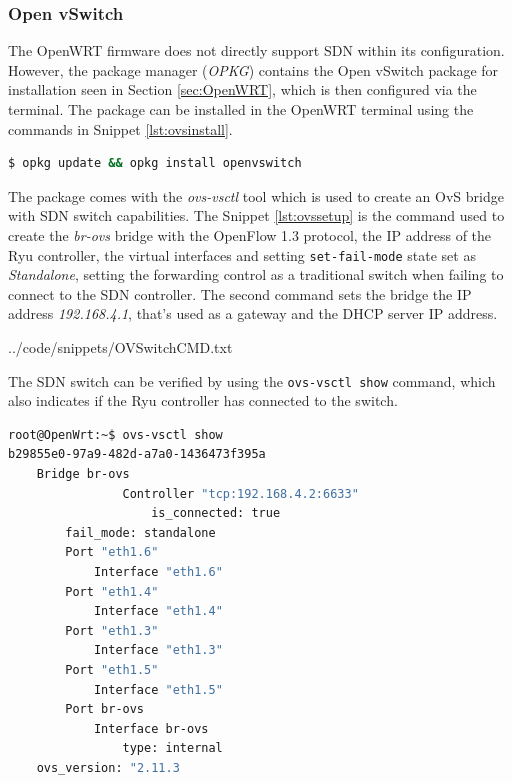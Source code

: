 \documentclass[12pt, oneside]{book}
\begin{document}
\subsubsection{Open vSwitch}
The OpenWRT firmware does not directly support SDN within its configuration. However, the package manager
(\emph{OPKG}) contains the Open vSwitch package for installation seen in Section \ref{sec:OpenWRT}, which
is then configured via the terminal. The package can be installed in the OpenWRT terminal using the
commands in Snippet \ref{lst:ovsinstall}.

\begin{lstlisting}[language=Bash,caption={OvS installation},captionpos=b,label={lst:ovsinstall}]
$ opkg update && opkg install openvswitch
\end{lstlisting}

The package comes with the \emph{ovs-vsctl} tool which is used to create an OvS bridge
with SDN switch capabilities. The Snippet \ref{lst:ovssetup} is the command used to create the \emph{br-ovs} bridge
with the OpenFlow 1.3 protocol, the IP address of the Ryu controller, the virtual interfaces and setting \lstinline{set-fail-mode}
state set as \emph{Standalone},
setting the forwarding control as a traditional switch when failing to connect to the SDN controller.
The second command sets the bridge the IP address \emph{192.168.4.1}, that's used as a gateway and the DHCP server IP address.


{../code/snippets/OVSwitchCMD.txt}

The SDN switch can be verified by using the \lstinline{ovs-vsctl show} command, which also indicates
if the Ryu controller has connected to the switch.
\begin{lstlisting}[language=Bash,caption={OvS Verification},captionpos=b,label={lst:ovsinstalled}]
root@OpenWrt:~$ ovs-vsctl show
b29855e0-97a9-482d-a7a0-1436473f395a
    Bridge br-ovs
				Controller "tcp:192.168.4.2:6633"
					is_connected: true
        fail_mode: standalone
        Port "eth1.6"
            Interface "eth1.6"
        Port "eth1.4"
            Interface "eth1.4"
        Port "eth1.3"
            Interface "eth1.3"
        Port "eth1.5"
            Interface "eth1.5"
        Port br-ovs
            Interface br-ovs
                type: internal
    ovs_version: "2.11.3
	\end{lstlisting}
\end{document}
